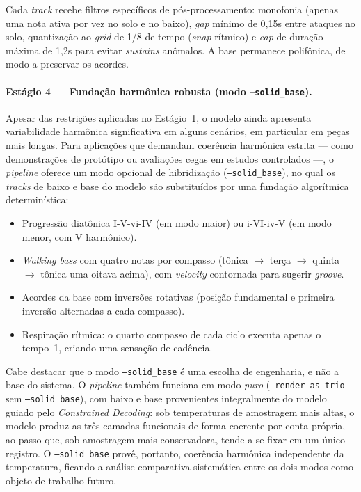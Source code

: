 \documentclass[12pt]{article}
\begin{document}
Cada \emph{track} recebe filtros específicos de pós-processamento: monofonia
(apenas uma nota ativa por vez no solo e no baixo), \emph{gap} mínimo de 0,15s
entre ataques no solo, quantização ao \emph{grid} de 1/8 de tempo (\emph{snap}
rítmico) e \emph{cap} de duração máxima de 1,2s para evitar \emph{sustains}
anômalos. A base permanece polifônica, de modo a preservar os acordes.

\paragraph{Estágio 4 --- Fundação harmônica robusta (modo
\texttt{--solid\_base}).} Apesar das restrições aplicadas no Estágio~1, o modelo
ainda apresenta variabilidade harmônica significativa em alguns cenários, em
particular em peças mais longas. Para aplicações que demandam coerência harmônica
estrita --- como demonstrações de protótipo ou avaliações cegas em estudos
controlados ---, o \emph{pipeline} oferece um modo opcional de hibridização
(\texttt{--solid\_base}), no qual os \emph{tracks} de baixo e base do modelo são
substituídos por uma fundação algorítmica determinística:

\begin{itemize}
  \item Progressão diatônica I-V-vi-IV (em modo maior) ou i-VI-iv-V (em modo
    menor, com V harmônico).
  \item \emph{Walking bass} com quatro notas por compasso (tônica $\to$ terça
    $\to$ quinta $\to$ tônica uma oitava acima), com \emph{velocity} contornada
    para sugerir \emph{groove}.
  \item Acordes da base com inversões rotativas (posição fundamental e primeira
    inversão alternadas a cada compasso).
  \item Respiração rítmica: o quarto compasso de cada ciclo executa apenas o
    tempo~1, criando uma sensação de cadência.
\end{itemize}

Cabe destacar que o modo \texttt{--solid\_base} é uma escolha de engenharia, e não
a base do sistema. O \emph{pipeline} também funciona em modo \emph{puro}
(\texttt{--render\_as\_trio} sem \texttt{--solid\_base}), com baixo e base
provenientes integralmente do modelo guiado pelo \emph{Constrained Decoding}: sob
temperaturas de amostragem mais altas, o modelo produz as três camadas funcionais
de forma coerente por conta própria, ao passo que, sob amostragem mais
conservadora, tende a se fixar em um único registro. O \texttt{--solid\_base}
provê, portanto, coerência harmônica independente da temperatura, ficando a
análise comparativa sistemática entre os dois modos como objeto de trabalho
futuro.
\end{document}
